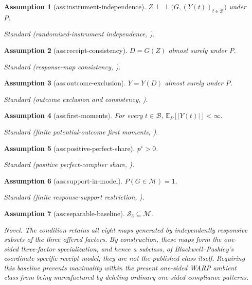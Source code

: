 \documentclass{article}
\newtheorem{assumption}{Assumption}
\begin{document}
\begin{assumption}[ass:instrument-independence]\label{ass:instrument-independence}
\(Z\perp\!\!\!\perp\bigl(G,(Y(t))_{t\in\mathcal B}\bigr)\) under \(P\).
\par\smallskip\noindent\emph{Standard} (randomized-instrument independence, \cite{Goff2026OutcomeNonrestrictive}).
\end{assumption}

\begin{assumption}[ass:receipt-consistency]\label{ass:receipt-consistency}
\(D=G(Z)\) almost surely under \(P\).
\par\smallskip\noindent\emph{Standard} (response-map consistency, \cite{Goff2026OutcomeNonrestrictive}).
\end{assumption}

\begin{assumption}[ass:outcome-exclusion]\label{ass:outcome-exclusion}
\(Y=Y(D)\) almost surely under \(P\).
\par\smallskip\noindent\emph{Standard} (outcome exclusion and consistency, \cite{BlackwellPashley2023FactorialIV}).
\end{assumption}

\begin{assumption}[ass:first-moments]\label{ass:first-moments}
For every \(t\in\mathcal B\), \(\mathbb E_P[|Y(t)|]<\infty\).
\par\smallskip\noindent\emph{Standard} (finite potential-outcome first moments, \cite{Goff2026OutcomeNonrestrictive}).
\end{assumption}

\begin{assumption}[ass:positive-perfect-share]\label{ass:positive-perfect-share}
\(p^\star>0\).
\par\smallskip\noindent\emph{Standard} (positive perfect-complier share, \cite{BlackwellPashley2023FactorialIV}).
\end{assumption}

\begin{assumption}[ass:support-in-model]\label{ass:support-in-model}
\(P(G\in\mathcal M)=1\).
\par\smallskip\noindent\emph{Standard} (finite response-support restriction, \cite{Goff2026OutcomeNonrestrictive}).
\end{assumption}

\begin{assumption}[ass:separable-baseline]\label{ass:separable-baseline}
\(\mathcal S_3\subseteq\mathcal M\).
\par\smallskip\noindent\emph{Novel.} The condition retains all eight maps generated by independently responsive subsets of the three offered factors. By construction, these maps form the one-sided three-factor specialization, and hence a subclass, of Blackwell--Pashley's coordinate-specific receipt model; they are not the published class itself. Requiring this baseline prevents maximality within the present one-sided WARP ambient class from being manufactured by deleting ordinary one-sided compliance patterns.
\end{assumption}
\end{document}
